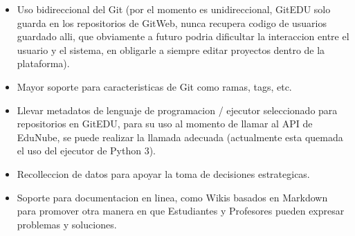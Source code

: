 \begin{itemize}
    \item Uso bidireccional del Git (por el momento es unidireccional, GitEDU solo guarda en los repositorios de GitWeb, nunca recupera codigo de usuarios guardado alli, que obviamente a futuro podria dificultar la interaccion entre el usuario y el sistema, en obligarle a siempre editar proyectos dentro de la plataforma).
    \item Mayor soporte para caracteristicas de Git como ramas, tags, etc.
    \item Llevar metadatos de lenguaje de programacion / ejecutor seleccionado para repositorios en GitEDU, para su uso al momento de llamar al API de EduNube, se puede realizar la llamada adecuada (actualmente esta quemada el uso del ejecutor de Python 3).
    \item Recolleccion de datos para apoyar la toma de decisiones estrategicas.
    \item Soporte para documentacion en linea, como Wikis basados en Markdown para promover otra manera en que Estudiantes y Profesores pueden expresar problemas y soluciones.
\end{itemize}
